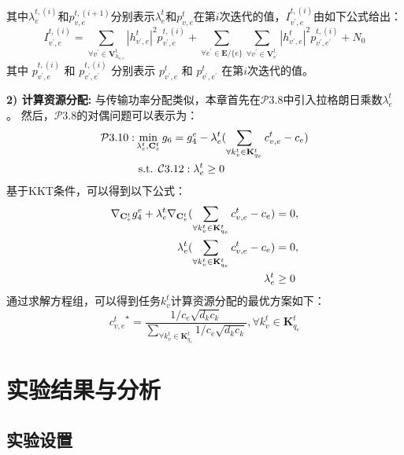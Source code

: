 其中$\lambda_{e}^{t,(i)}$和$p_{v, e}^{t, (i+1)}$分别表示$\lambda_{e}^{t}$和$p_{v, e}^{t}$在第$i$次迭代的值，${I}_{v^{\prime}, e}^{t, (i)}$由如下公式给出：
\begin{equation}
	{I}_{v^{\prime}, e}^{t, (i)} = \sum\limits_{\forall v^{\prime} \in \mathbf{V}_{h_{v, e}}^{t}} |h_{v^{\prime}, e}^t|^2 p_{v^{\prime}, e}^{t, (i)} + \sum\limits_{\forall e^{\prime} \in \mathbf{E} / \{e\}} \sum\limits_{\forall v^{\prime} \in \mathbf{V}_{e^{\prime}}^{t}} |h_{v^{\prime}, e}^t|^2 p_{v^{\prime}, e^{\prime}}^{t, (i)} + N_{0}
\end{equation}
其中 $p_{v^{\prime}, e}^{t, (i)}$ 和 $p_{v^{\prime}, e^{\prime}}^{t, (i)}$ 分别表示 $p_{v^{\prime}, e}^{t}$ 和 $p_{v^{\prime}, e^{\prime}}^{t}$ 在第$i$次迭代的值。

\textbf{2) 计算资源分配:} 与传输功率分配类似，本章首先在$\mathcal{P}3.8$中引入拉格朗日乘数${\lambda}_{e}^{t}$。
然后，$\mathcal{P}3.8$的对偶问题可以表示为：
\begin{align}
	\mathcal{P}3.10: & \min_{\mathbf{\lambda}_{e}^{t}, \mathbf{{C}}_{e}^{t}}  g_6 = g_4^e - {\lambda}_{e}^{t} (\sum_{\forall k_{v}^{t} \in {\mathbf{K}_{q_e}^{t} }} {c_{v, e}^t} - c_{e} ) \notag \\
		&\text { s.t. } \mathcal{C}3.12: \mathbf{\lambda}_{e}^{t} \geq 0 
\end{align}
基于KKT条件\cite{boyd2004convex}，可以得到以下公式：
\begin{align}
	\nabla_{\mathbf{C}_e^{t}} g_4^e + \mathbf{\lambda}_{e}^{t}\nabla_{\mathbf{C}_e^{t}} (\sum_{\forall k_{v}^{t} \in {\mathbf{K}_{q_e}^{t} }} {c_{v, e}^t} - c_{e} ) &= 0, \notag \\
	\mathbf{\lambda}_{e}^{t}( \sum_{\forall k_{v}^{t} \in {\mathbf{K}_{q_e}^{t} }} {c_{v, e}^t} - {c_{e}} ) &= 0, \notag \\
	\mathbf{\lambda}_{e}^{t} &\geq 0
\end{align}
通过求解方程组，可以得到任务$k_{v}^{t}$计算资源分配的最优方案如下：
\begin{equation}
	{c_{v, e}^{t}}^{\star} = \frac{1 / c_e \sqrt{d_k  c_k} } {\sum_{\forall k_{v}^{t} \in {\mathbf{K}_{q_e}^{t} }} 1 / c_e \sqrt{d_k  c_k}} , \forall k_{v}^{t} \in {\mathbf{K}_{q_e}^{t} } 
\end{equation}

\section{实验结果与分析}\label{section 3-5}

\subsection{实验设置}

